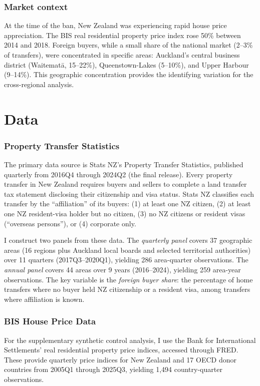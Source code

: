 \documentclass[12pt]{article}
\begin{document}
\subsubsection*{Market context} At the time of the ban, New Zealand was experiencing rapid house price appreciation. The BIS real residential property price index rose 50\% between 2014 and 2018. Foreign buyers, while a small share of the national market (2--3\% of transfers), were concentrated in specific areas: Auckland's central business district (Waitemat\=a, 15--22\%), Queenstown-Lakes (5--10\%), and Upper Harbour (9--14\%). This geographic concentration provides the identifying variation for the cross-regional analysis.

\section{Data}

\subsubsection*{Property Transfer Statistics} The primary data source is Stats NZ's Property Transfer Statistics, published quarterly from 2016Q4 through 2024Q2 (the final release). Every property transfer in New Zealand requires buyers and sellers to complete a land transfer tax statement disclosing their citizenship and visa status. Stats NZ classifies each transfer by the ``affiliation'' of its buyers: (1) at least one NZ citizen, (2) at least one NZ resident-visa holder but no citizen, (3) no NZ citizens or resident visas (``overseas persons''), or (4) corporate only.

I construct two panels from these data. The \emph{quarterly panel} covers 37 geographic areas (16 regions plus Auckland local boards and selected territorial authorities) over 11 quarters (2017Q3--2020Q1), yielding 286 area-quarter observations. The \emph{annual panel} covers 44 areas over 9 years (2016--2024), yielding 259 area-year observations. The key variable is the \emph{foreign buyer share}: the percentage of home transfers where no buyer held NZ citizenship or a resident visa, among transfers where affiliation is known.

\subsubsection*{BIS House Price Data} For the supplementary synthetic control analysis, I use the Bank for International Settlements' real residential property price indices, accessed through FRED. These provide quarterly price indices for New Zealand and 17 OECD donor countries from 2005Q1 through 2025Q3, yielding 1,494 country-quarter observations.
\end{document}
